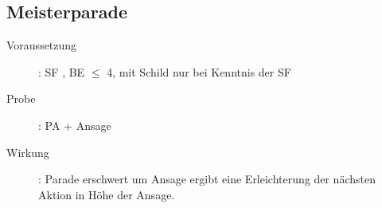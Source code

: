 \subsection{Meisterparade}
\label{reaktion.meisterparade}
\begin{description}
    \item[Voraussetzung]:
    SF , BE\textrm{ ${\leq}$ }4,  mit Schild nur bei Kenntnis der SF 
    \item[Probe]:
        PA + Ansage
    \item[Wirkung]:
        Parade erschwert um Ansage ergibt eine Erleichterung der nächsten Aktion in Höhe der Ansage.
\end{description}

